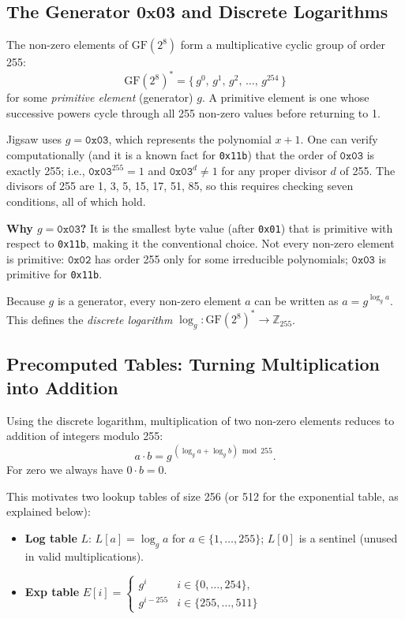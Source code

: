 \documentclass[12pt]{article}
\theoremstyle{definition}
\theoremstyle{plain}
\begin{document}
	\subsection{The Generator $\mathbf{0x03}$ and Discrete Logarithms}
	
	The non-zero elements of $\mathrm{GF}(2^8)$ form a multiplicative cyclic
	group of order 255:
	$$ \mathrm{GF}(2^8)^* = \bigl\{\, g^0,\, g^1,\, g^2,\, \dots,\, g^{254} \,\bigr\} $$
	for some \emph{primitive element} (generator) $g$.  A primitive element is
	one whose successive powers cycle through all 255 non-zero values before
	returning to 1.
	
	Jigsaw uses $g = \texttt{0x03}$, which represents the polynomial $x + 1$.
	One can verify computationally (and it is a known fact for \texttt{0x11b})
	that the order of $\texttt{0x03}$ is exactly 255; i.e.,
	$\texttt{0x03}^{255} = 1$ and $\texttt{0x03}^{d} \ne 1$ for any proper
	divisor $d$ of 255.  The divisors of 255 are 1, 3, 5, 15, 17, 51, 85, so
	this requires checking seven conditions, all of which hold.
	
	\textbf{Why $g = \texttt{0x03}$?}  It is the smallest byte value (after
	\texttt{0x01}) that is primitive with respect to \texttt{0x11b}, making it
	the conventional choice.  Not every non-zero element is primitive:
	$\texttt{0x02}$ has order 255 only for some irreducible polynomials;
	$\texttt{0x03}$ is primitive for \texttt{0x11b}.
	
	Because $g$ is a generator, every non-zero element $a$ can be written as
	$a = g^{\log_g a}$.  This defines the \emph{discrete logarithm}
	$\log_g : \mathrm{GF}(2^8)^* \to \mathbb{Z}_{255}$.
	
	\subsection{Precomputed Tables: Turning Multiplication into Addition}
	
	Using the discrete logarithm, multiplication of two non-zero elements
	reduces to addition of integers modulo 255:
	$$
	a \cdot b = g^{\,(\log_g a + \log_g b) \bmod 255}.
	$$
	For zero we always have $0 \cdot b = 0$.
	
	This motivates two lookup tables of size 256 (or 512 for the exponential
	table, as explained below):
	
	\begin{itemize}
		\item \textbf{Log table} $L$: \quad $L[a] = \log_g a$ for $a \in \{1,\dots,255\}$; $L[0]$ is a sentinel (unused in valid multiplications).
		\item \textbf{Exp table} $ E[i] = \begin{cases} g^i & i \in \{0,\dots,254\}, \\ g^{i - 255} & i \in \{255,\dots,511\} \end{cases} $
	\end{itemize}
	
\end{document}
